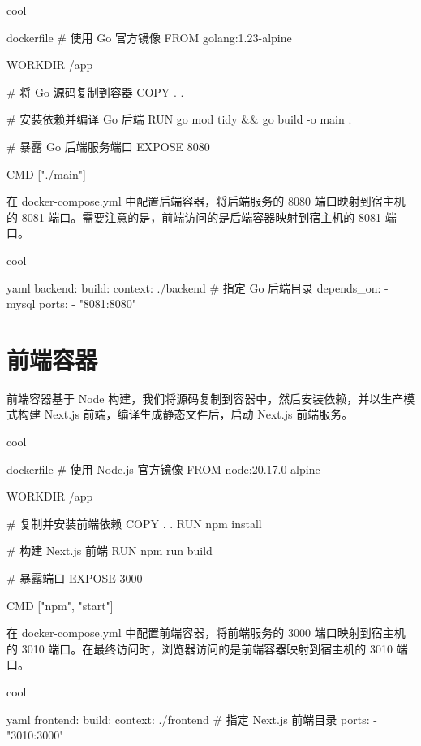 \begin{codebox}{}{cool}
\begin{amzcode}{dockerfile}
# 使用 Go 官方镜像
FROM golang:1.23-alpine

WORKDIR /app

# 将 Go 源码复制到容器
COPY . .

# 安装依赖并编译 Go 后端
RUN go mod tidy && go build -o main .

# 暴露 Go 后端服务端口
EXPOSE 8080

CMD ["./main"]
\end{amzcode}
\end{codebox}

在 docker-compose.yml 中配置后端容器，将后端服务的 8080 端口映射到宿主机的 8081 端口。需要注意的是，前端访问的是后端容器映射到宿主机的 8081 端口。

\begin{codebox}{}{cool}
\begin{amzcode}{yaml}
  backend:
    build:
      context: ./backend # 指定 Go 后端目录
    depends_on:
      - mysql
    ports:
      - "8081:8080"
\end{amzcode}
\end{codebox}

\section{前端容器}

前端容器基于 Node 构建，我们将源码复制到容器中，然后安装依赖，并以生产模式构建 Next.js 前端，编译生成静态文件后，启动 Next.js 前端服务。

\begin{codebox}{}{cool}
\begin{amzcode}{dockerfile}
# 使用 Node.js 官方镜像
FROM node:20.17.0-alpine

WORKDIR /app

# 复制并安装前端依赖
COPY . .
RUN npm install

# 构建 Next.js 前端
RUN npm run build

# 暴露端口
EXPOSE 3000

CMD ["npm", "start"]
\end{amzcode}
\end{codebox}

在 docker-compose.yml 中配置前端容器，将前端服务的 3000 端口映射到宿主机的 3010 端口。在最终访问时，浏览器访问的是前端容器映射到宿主机的 3010 端口。

\begin{codebox}{}{cool}
\begin{amzcode}{yaml}
  frontend:
    build:
      context: ./frontend # 指定 Next.js 前端目录
    ports:
      - "3010:3000"
\end{amzcode}
\end{codebox}

